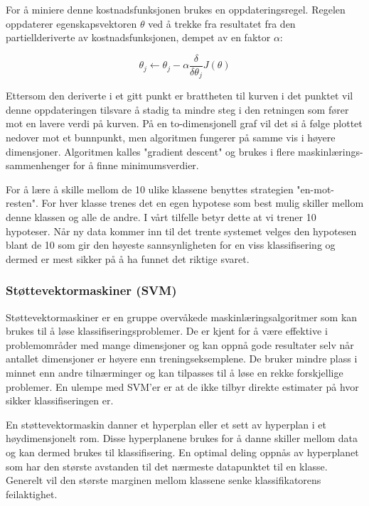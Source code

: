 For å miniere denne kostnadsfunksjonen brukes en oppdateringsregel. Regelen oppdaterer egenskapsvektoren $\theta$ ved å trekke fra resultatet fra den partiellderiverte av kostnadsfunksjonen, dempet av en faktor $\alpha$:

\begin{equation}
\theta_j \leftarrow \theta_j - \alpha \frac{\delta}{\delta\theta_j}J(\theta)
\label{eq:gradient}
\end{equation}

Ettersom den deriverte i et gitt punkt er brattheten til kurven i det punktet vil denne oppdateringen tilsvare å stadig ta mindre steg i den retningen som fører mot en lavere verdi på kurven. På en to-dimensjonell graf vil det si å følge plottet nedover mot et bunnpunkt, men algoritmen fungerer på samme vis i høyere dimensjoner. Algoritmen kalles "gradient descent" og brukes i flere maskinlærings-sammenhenger for å finne minimumsverdier.

For å lære å skille mellom de 10 ulike klassene benyttes strategien "en-mot-resten". For hver klasse trenes det en egen hypotese som best mulig skiller mellom denne klassen og alle de andre. I vårt tilfelle betyr dette at vi trener 10 hypoteser. Når ny data kommer inn til det trente systemet velges den hypotesen blant de 10 som gir den høyeste sannsynligheten for en viss klassifisering og dermed er mest sikker på å ha funnet det riktige svaret.

\subsubsection*{Støttevektormaskiner (SVM)}
Støttevektormaskiner er en gruppe overvåkede maskinlæringsalgoritmer som kan brukes til å løse klassifiseringsproblemer. De er kjent for å være effektive i problemområder med mange dimensjoner og kan oppnå gode resultater selv når antallet dimensjoner er høyere enn treningseksemplene. De bruker mindre plass i minnet enn andre tilnærminger og kan tilpasses til å løse en rekke forskjellige problemer. En ulempe med SVM'er er at de ikke tilbyr direkte estimater på hvor sikker klassifiseringen er.

En støttevektormaskin danner et hyperplan eller et sett av hyperplan i et høydimensjonelt rom. Disse hyperplanene brukes for å danne skiller mellom data og kan dermed brukes til klassifisering. En optimal deling oppnås av hyperplanet som har den største avstanden til det nærmeste datapunktet til en klasse. Generelt vil den største marginen mellom klassene senke klassifikatorens feilaktighet.

